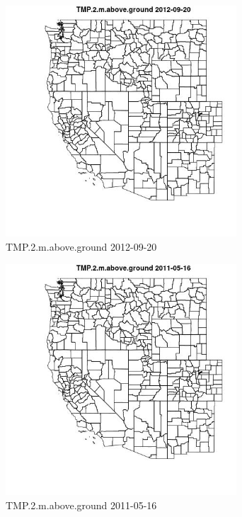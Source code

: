 \begin{figure} 
\centering  
\includegraphics[width=0.77\textwidth]{Code_Outputs/ML_input_report_ML_input_PM25_Step5_part_d_de_duplicated_aves_ML_input_MapObsTMP2maboveground2012-09-20.jpg} 
\caption{\label{fig:ML_input_report_ML_input_PM25_Step5_part_d_de_duplicated_aves_ML_inputMapObsTMP2maboveground2012-09-20}TMP.2.m.above.ground 2012-09-20} 
\end{figure} 
 

\begin{figure} 
\centering  
\includegraphics[width=0.77\textwidth]{Code_Outputs/ML_input_report_ML_input_PM25_Step5_part_d_de_duplicated_aves_ML_input_MapObsTMP2maboveground2011-05-16.jpg} 
\caption{\label{fig:ML_input_report_ML_input_PM25_Step5_part_d_de_duplicated_aves_ML_inputMapObsTMP2maboveground2011-05-16}TMP.2.m.above.ground 2011-05-16} 
\end{figure} 
 

